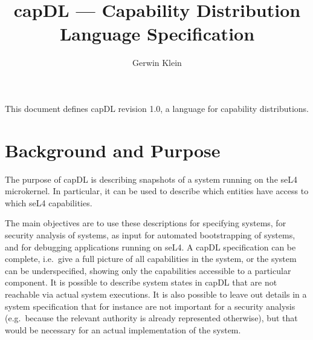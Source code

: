 \documentclass[a4paper,11pt]{article}
\date{}
\newcommand{\FIXME}[1]{\textbf{\textsl{FIXME: #1}}}
\newcommand{\FIXME}[1]{\relax}
\begin{document}
\title{capDL --- Capability Distribution Language Specification}
\author{Gerwin Klein}
\maketitle

\noindent
This document defines capDL revision 1.0, a language for capability
distributions.

\section{Background and Purpose}
\label{sec:capDL:purpose}

The purpose of capDL is describing snapshots of a system running on the seL4
microkernel. In particular, it can be used to describe which entities 
have access to which seL4 capabilities.

The main objectives are to use these descriptions for specifying systems, for
security analysis of systems, as input for automated bootstrapping of systems,
and for debugging applications running on seL4. A capDL specification can be
complete, i.e.\ give a full picture of all capabilities in the system, or the
system can be underspecified, showing only the capabilities accessible to a
particular component. It is possible to describe system states in capDL that
are not reachable via actual system executions. It is also possible to leave
out details in a system specification that for instance are not important for
a security analysis (e.g.\ because the relevant authority is already
represented otherwise), but that would be necessary for an actual
implementation of the system.


%
%
%
%
%
%
%
%
%
%
%
%
%
%
%
%
%
\end{document}
